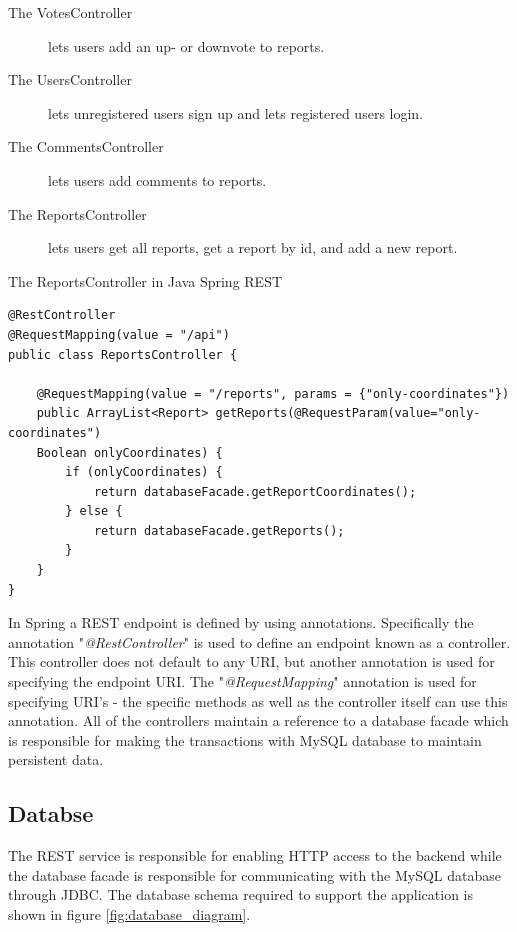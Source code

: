 \begin{description}
\item [The VotesController] lets users add an up- or downvote to reports.
\item [The UsersController] lets unregistered users sign up and lets registered users login.
\item [The CommentsController] lets users add comments to reports.
\item [The ReportsController] lets users get all reports, get a report by id, and add a new report.
\end{description}

\begin{listing}[H]
\caption{The ReportsController in Java Spring REST}\label{lst:restController}
\begin{verbatim}
@RestController
@RequestMapping(value = "/api")
public class ReportsController {

    @RequestMapping(value = "/reports", params = {"only-coordinates"})
    public ArrayList<Report> getReports(@RequestParam(value="only-coordinates")
    Boolean onlyCoordinates) {
        if (onlyCoordinates) {
            return databaseFacade.getReportCoordinates();
        } else {
            return databaseFacade.getReports();
        }
    }
}
\end{verbatim}
\end{listing}

In Spring a REST endpoint is defined by using annotations. Specifically the annotation "\textit{@RestController}" is used to define an endpoint known as a  controller. This controller does not default to any URI, but another annotation is used for specifying the endpoint URI. The "\textit{@RequestMapping}" annotation is used for specifying URI's - the specific methods as well as the controller itself can use this annotation. All of the controllers maintain a reference to a database facade which is responsible for making the transactions with MySQL database to maintain persistent data.

\subsection{Databse}
The REST service is responsible for enabling HTTP access to the backend while the database facade is responsible for communicating with the MySQL database through JDBC. The database schema required to support the application is shown in figure \ref{fig:database_diagram}.

